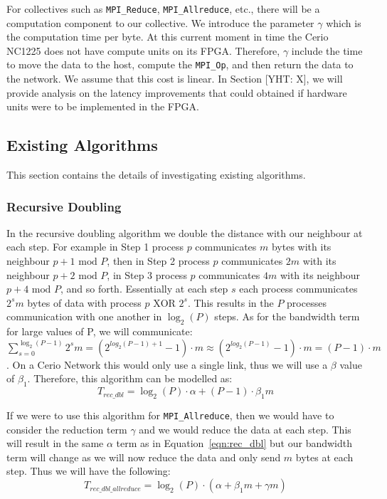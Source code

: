 \documentclass{article}
\newcommand{\yht}[1]{{\color{red}[YHT: #1]}}
\begin{document}
  For collectives such as \texttt{MPI\_Reduce}, \texttt{MPI\_Allreduce}, etc.,
  there will be a computation component to our collective.
  We introduce the parameter $\gamma$ which is the computation time per byte.
  At this current moment in time the Cerio NC1225 does not have compute units on
  its FPGA.
  Therefore,
  $\gamma$ include the time to move the data to the host,
  compute the \texttt{MPI\_Op},
  and then return the data to the network.
  We assume that this cost is linear.
  In Section \yht{X},
  we will provide analysis on the latency improvements
  that could obtained if hardware units were to be implemented in the FPGA.
  \subsection{Existing Algorithms}
  \noindent
  This section contains the details of investigating existing algorithms.

  \subsubsection{Recursive Doubling}
  In the recursive doubling algorithm we double the distance with our neighbour at each step.
  For example in Step 1 process $p$ communicates $m$ bytes with its neighbour $p + 1 \text{~mod~} P$,
  then in Step 2 process $p$ communicates $2m$ with its neighbour $p + 2 \text{~mod~} P$,
  in Step 3 process $p$ communicates $4m$ with its neighbour $p + 4 \text{~mod~} P$,
  and so forth.
  Essentially at each step $s$ each process communicates $2^s m$ bytes of data
  with process $p \text{~XOR~} 2^s$.
  This results in the $P$ processes communication with one another in $\log_2(P)$ steps.
  As for the bandwidth term for large values of P,
  we will communicate:
  $
  \sum_{s=0}^{\log_2(P - 1)} 2^s m = (2^{log_2(P-1) + 1} - 1) \cdot m
                             \approx (2^{log_2(P-1)} - 1 ) \cdot m
                                   = (P - 1) \cdot m
  $.
  On a Cerio Network this would only use a single link,
  thus we will use a $\beta$ value of $\beta_1$.
  Therefore,
  this algorithm can be modelled as:
  \begin{equation}
    \label{eqn:rec_dbl}
    T_{rec\_dbl} = \log_2(P) \cdot \alpha + (P - 1) \cdot \beta_1 m
  \end{equation}

  If we were to use this algorithm for \texttt{MPI\_Allreduce},
  then we would have to consider the reduction term $\gamma$ and we would reduce the data at each
  step.
  This will result in the same $\alpha$ term as in Equation~\ref{eqn:rec_dbl}
  but our bandwidth term will change as we will
  now reduce the data and only send $m$ bytes at each step.
  Thus we will have the following:
  \begin{equation}
    T_{rec\_dbl\_allreduce}
    = \log_2(P) \cdot (\alpha + \beta_1 m + \gamma m )
  \end{equation}
\end{document}
